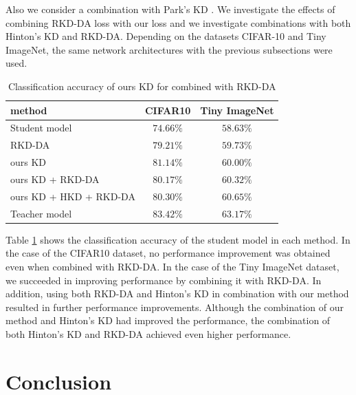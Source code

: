 \documentclass[a4paper,12pt]{article}
\begin{document}
Also we consider a combination with Park's KD \cite{Park2019}.
We investigate the effects of combining RKD-DA loss with our loss and we investigate combinations with both Hinton's KD \cite{Hinton2015} and RKD-DA.
Depending on the datasets CIFAR-10 and Tiny ImageNet, the same network architectures with the previous subsections were used.

\begin{table}[ht]
\caption{Classification accuracy of ours KD for combined with RKD-DA}
\label{table:combinedRKD}
\begin{center}
\begin{tabular}{|l|c|c|}
\hline
method & CIFAR10 & Tiny ImageNet \\ \hline \hline
Student model &$74.66\%$  & $58.63\%$ \\ \hline
RKD-DA & $79.21\%$  & $59.73\%$   \\ \hline
ours KD & $\bm{81.14}\%$ & $60.00\%$   \\ \hline
ours KD + RKD-DA & $80.17\%$    &  $\bm{60.32}\%$     \\ \hline
ours KD + HKD + RKD-DA &  $80.30\%$   & $\bm{60.65}\%$      \\ \hline
Teacher model  & $83.42\%$  & $63.17\%$  \\
\hline
\end{tabular}
\end{center}
\end{table}

Table \ref{table:combinedRKD} shows the classification accuracy of the student model in each method.
In the case of the CIFAR10 dataset, no performance improvement was obtained even when combined with RKD-DA.
In the case of the Tiny ImageNet dataset, we succeeded in improving performance by combining it with RKD-DA.
In addition, using both RKD-DA and Hinton's KD in combination with our method resulted in further performance improvements.
Although the combination of our method and Hinton's KD had improved the performance, the combination of both Hinton's KD and RKD-DA achieved even higher performance.
\section{Conclusion}


\end{document}
